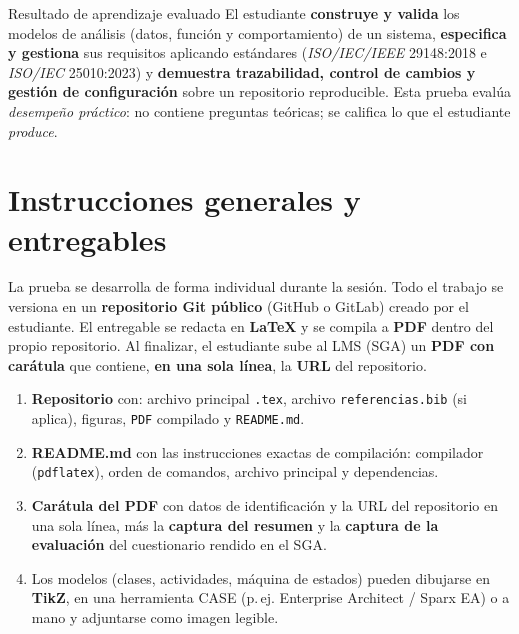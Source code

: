 \documentclass[11pt,a4paper,oneside]{article}
\begin{document}
\begin{concepto}{Resultado de aprendizaje evaluado}
El estudiante \textbf{construye y valida} los modelos de an\'alisis (datos, funci\'on y comportamiento) de un sistema, \textbf{especifica y gestiona} sus requisitos aplicando est\'andares (\textit{ISO/IEC/IEEE} 29148:2018 e \textit{ISO/IEC} 25010:2023) y \textbf{demuestra trazabilidad, control de cambios y gesti\'on de configuraci\'on} sobre un repositorio reproducible. Esta prueba eval\'ua \emph{desempe\~no pr\'actico}: no contiene preguntas te\'oricas; se califica lo que el estudiante \emph{produce}.
\end{concepto}

\section{Instrucciones generales y entregables}

La prueba se desarrolla de forma individual durante la sesi\'on. Todo el trabajo se versiona en un \textbf{repositorio Git p\'ublico} (GitHub o GitLab) creado por el estudiante. El entregable se redacta en \textbf{LaTeX} y se compila a \textbf{PDF} dentro del propio repositorio. Al finalizar, el estudiante sube al LMS (SGA) un \textbf{PDF con car\'atula} que contiene, \textbf{en una sola l\'inea}, la \textbf{URL} del repositorio.

\begin{enumerate}[leftmargin=1.4em,itemsep=1pt,topsep=2pt]
  \item \textbf{Repositorio} con: archivo principal \texttt{.tex}, archivo \texttt{referencias.bib} (si aplica), figuras, \texttt{PDF} compilado y \texttt{README.md}.
  \item \textbf{README.md} con las instrucciones exactas de compilaci\'on: compilador (\texttt{pdflatex}), orden de comandos, archivo principal y dependencias.
  \item \textbf{Car\'atula del PDF} con datos de identificaci\'on y la URL del repositorio en una sola l\'inea, m\'as la \textbf{captura del resumen} y la \textbf{captura de la evaluaci\'on} del cuestionario rendido en el SGA.
  \item Los modelos (clases, actividades, m\'aquina de estados) pueden dibujarse en \textbf{TikZ}, en una herramienta CASE (p.\,ej. Enterprise Architect / Sparx EA) o a mano y adjuntarse como imagen legible.
\end{enumerate}
\end{document}
